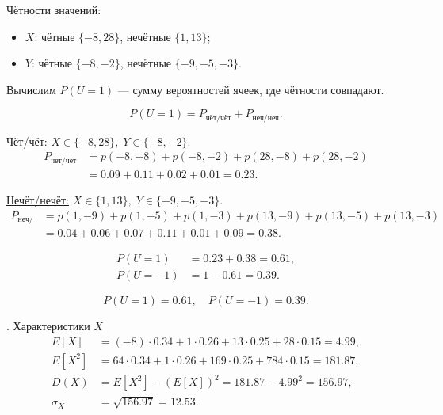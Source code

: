 \documentclass[a4paper,14pt]{extarticle}
\begin{document}
            Чётности значений:
            \begin{itemize}
                \item $X$: чётные $\{-8, 28\}$, нечётные $\{1, 13\}$;
                \item $Y$: чётные $\{-8, -2\}$, нечётные $\{-9, -5, -3\}$.
            \end{itemize}
            
            Вычислим $P(U=1)$ — сумму вероятностей ячеек, где чётности совпадают.
            
            \[
                P(U=1) = P_{\text{чёт/чёт}} + P_{\text{неч/неч}}.
            \]
            
            \noindent\underline{Чёт/чёт:} $X \in \{-8, 28\}, \; Y \in \{-8, -2\}$.
            \[
                \begin{aligned}
                    P_{\text{чёт/чёт}} &= p(-8,-8) + p(-8,-2) + p(28,-8) + p(28,-2) \\
                    &= 0.09 + 0.11 + 0.02 + 0.01 = 0.23.
                \end{aligned}
            \]
            
            \noindent\underline{Нечёт/нечёт:} $X \in \{1, 13\}, \; Y \in \{-9, -5, -3\}$.
            \[
                \begin{aligned}
                    P_{\text{неч/неч}} &= p(1,-9) + p(1,-5) + p(1,-3) + p(13,-9) + p(13,-5) + p(13,-3) \\
                    &= 0.04 + 0.06 + 0.07 + 0.11 + 0.01 + 0.09 = 0.38.
                \end{aligned}
            \]
            
            \[
                \begin{aligned}
                    P(U=1) &= 0.23 + 0.38 = 0.61,\\
                    P(U=-1) &= 1 - 0.61 = 0.39.
                \end{aligned}
            \]
            
            \[
                \boxed{P(U=1)=0.61, \quad P(U=-1)=0.39.}
            \]
            
            
            . Характеристики $X$
            \[
                \begin{aligned}
                    E[X] &= (-8)\cdot0.34 + 1\cdot0.26 + 13\cdot0.25 + 28\cdot0.15 = 4.99, \\
                    E[X^2] &= 64\cdot0.34 + 1\cdot0.26 + 169\cdot0.25 + 784\cdot0.15 = 181.87, \\
                    D(X) &= E[X^2] - (E[X])^2 = 181.87 - 4.99^2 = 156.97, \\
                    \sigma_X &= \sqrt{156.97} = 12.53.
                \end{aligned}
            \]
            
\end{document}
